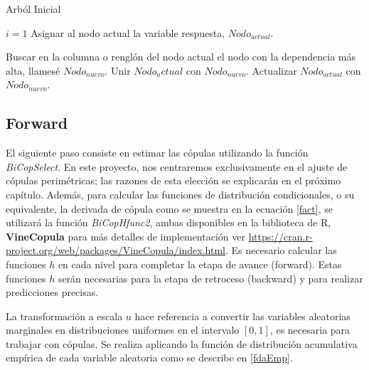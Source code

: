 \begin{algorithm}[H]
      \caption{Arból Inicial}
      \label{algT1}
      \begin{algorithmic}[1]  
        
        \State $i = 1$
        \State Asignar al nodo actual la variable respuesta, $Nodo_{actual}$.
        
          \State Buscar en la columna o renglón del nodo actual el nodo con la dependencia más alta, llamesé $Nodo_{nuevo}$.
          \State Unir $Nodo_actual$ con $Nodo_{nuevo}$.
          \State Actualizar $Nodo_{actual}$ con $Nodo_{nuevo}$.     
        \EndWhile
       
      \end{algorithmic}
    \end{algorithm}


\subsection{Forward}

El siguiente paso consiste en estimar las cópulas utilizando la función \textit{BiCopSelect}. En este proyecto, nos centraremos exclusivamente en el ajuste de cópulas perimétricas; las razones de esta elección se explicarán en el próximo capítulo. Además, para calcular las funciones de distribución condicionales, o su equivalente, la derivada de cópula como se muestra en la ecuación \eqref{fact}, se utilizará la función \textit{BiCopHfunc2}, ambas disponibles en la biblioteca de R, \textbf{VineCopula} para más detalles de implementación ver \url{https://cran.r-project.org/web/packages/VineCopula/index.html}. Es necesario calcular las funciones $h$ en cada nivel para completar la etapa de avance (forward). Estas funciones $h$ serán necesarias para la etapa de retroceso (backward) y para realizar predicciones precisas.

La transformación a escala $u$ hace referencia a convertir las variables aleatorias marginales en distribuciones uniformes en el intervalo $[0, 1]$, es necesaria para trabajar con cópulas. Se realiza aplicando la función de distribución acumulativa empírica de cada variable aleatoria como se describe en \eqref{fdaEmp}.

